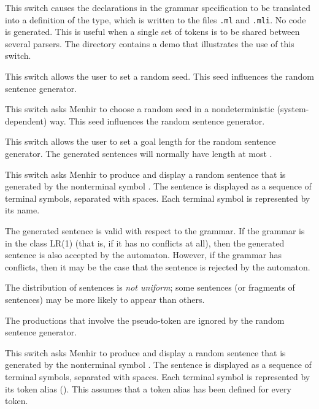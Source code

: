 \documentclass[onecolumn,11pt,nocopyrightspace,preprint]{sigplanconf}
\begin{document}
\docswitch{\oonlytokens} This switch causes the \dtoken declarations in
the grammar specification to be translated into a definition of the \token
type, which is written to the files \texttt{.ml} and
\texttt{.mli}. No code is generated. This is useful when
a single set of tokens is to be shared between several parsers. The directory
 contains a demo that illustrates the use of this switch.

 This switch allows the user to set
a random seed. This seed influences the random sentence generator.

\docswitch{\orandomselfinit} This switch asks Menhir to choose a random seed
in a nondeterministic (system-dependent) way. This seed influences the random
sentence generator.

 This switch allows the user to
set a goal length for the random sentence generator. The generated sentences
will normally have length at most .

 This switch asks Menhir to produce
and display a random sentence that is generated by the nonterminal symbol
. The sentence is displayed as a sequence of terminal symbols,
separated with spaces. Each terminal symbol is represented by its name.

The generated sentence is valid with respect to the grammar. If the grammar is
in the class LR(1) (that is, if it has no conflicts at all), then the
generated sentence is also accepted by the automaton. However, if the grammar
has conflicts, then it may be the case that the sentence is rejected by the
automaton.

The distribution of sentences is \emph{not uniform}; some sentences (or
fragments of sentences) may be more likely to appear than others.

The productions that involve the \error pseudo-token are ignored by the
random sentence generator.

 This switch asks Menhir to
produce and display a random sentence that is generated by the nonterminal
symbol . The sentence is displayed as a sequence of terminal
symbols, separated with spaces. Each terminal symbol is represented by its
token alias (). This assumes that a token alias has been
defined for every token.
\end{document}
